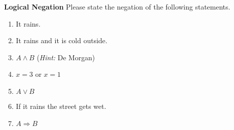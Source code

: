 \textbf{Logical Negation}
Please state the negation of the following statements.
\begin{enumerate}
	\item It rains.
	\item It rains and it is cold outside.
	\item $A \land B$ 
	(\textit{Hint: }De Morgan)
	\item $x = 3 $ or $x = 1$
	\item $A \lor B$
	\item If it rains the street gets wet.
	\item $A \Rightarrow B$ 
\end{enumerate}
